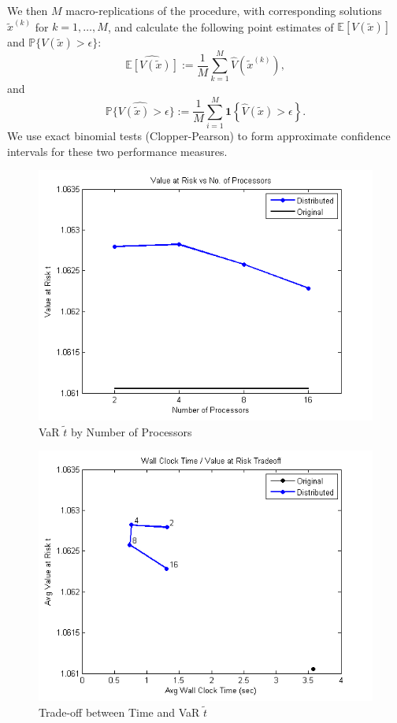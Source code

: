 \documentclass[12pt]{article}
\begin{document}
We then $M$ macro-replications of the procedure, with corresponding solutions $\tilde{x}^{(k)}$ for $k = 1, \ldots, M$, and calculate the following point estimates of $\mathbb{E}[V(\tilde{x})]$ and $\mathbb{P}\{V(\tilde{x}) > \epsilon\}$:
\[ \widehat{\mathbb{E}[V(\tilde{x})]} := \frac{1}{M} \sum_{k=1}^M \hat{V}(\tilde{x}^{(k)}), \]
and
\[ \widehat{\mathbb{P}\{V(\tilde{x}) > \epsilon\}} := \frac{1}{M} \sum_{i=1}^M \mathbf{1}\left\{\hat{V}(\tilde{x}) > \epsilon\right\}. \]
We use exact binomial tests (Clopper-Pearson) to form approximate confidence intervals for these two performance measures.

\begin{figure}[ht]
	\centering
		\includegraphics{../plot/figs/objfnval_num_proc.png}
	\caption{VaR $\tilde{t}$ by Number of Processors}
	\label{fig:objfnval_num_proc}
\end{figure}

\begin{figure}[ht]
	\centering
		\includegraphics{../plot/figs/wct_objfnval_frontier.png}
	\caption{Trade-off between Time and VaR $\tilde{t}$}
	\label{fig:wct_objfnval_frontier}
\end{figure}
\end{document}
